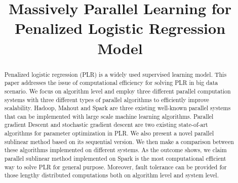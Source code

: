 \documentclass{llncs}
\begin{document}
\mainmatter  %

\title{Massively Parallel Learning for Penalized Logistic Regression Model}


%
%

%
\maketitle

\begin{abstract}
Penalized logistic regression (PLR) is a widely used supervised learning model.
This paper addresses the issue of computational efficiency for solving PLR in big data scenario.
We focus on algorithm level and employ three different parallel computation systems with three different types of parallel algorithms to efficiently improve scalability.
Hadoop, Mahout and Spark are three existing well-known parallel systems that can be implemented with large scale machine learning algorithms.
Parallel gradient Descent and stochastic gradient descent are two existing state-of-art algorithms for parameter optimization in PLR.
We also present a novel parallel sublinear method based on its sequential version.
We then make a comparison between these algorithms implemented on different systems.
As the outcome shows, we claim parallel sublinear method implemented on Spark is the most computational efficient way to solve PLR for general purpose.
Moreover, fault tolerance can be provided for those lengthy distributed computations both on algorithm level and system level.
\end{abstract}
\end{document}
